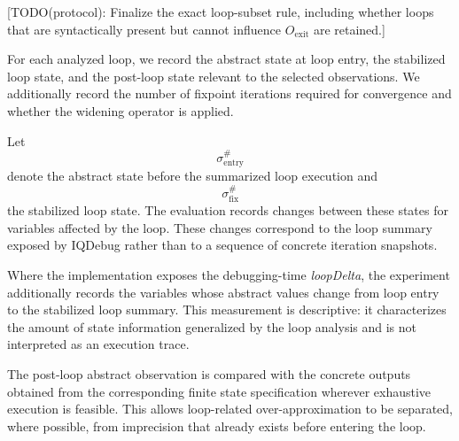 \documentclass[11pt,oneside]{report}
\theoremstyle{plain}
\theoremstyle{definition}
\theoremstyle{remark}
\begin{document}
[TODO(protocol): Finalize the exact loop-subset rule, including whether loops that are syntactically present but cannot influence \(O_{\mathrm{exit}}\) are retained.]

For each analyzed loop, we record the abstract state at loop entry, the stabilized loop state, and the post-loop state relevant to the selected observations. We additionally record the number of fixpoint iterations required for convergence and whether the widening operator is applied.

Let
\[
\sigma_{\mathrm{entry}}^\#
\]
denote the abstract state before the summarized loop execution and
\[
\sigma_{\mathrm{fix}}^\#
\]
the stabilized loop state. The evaluation records changes between these states for variables affected by the loop. These changes correspond to the loop summary exposed by IQDebug rather than to a sequence of concrete iteration snapshots.

Where the implementation exposes the debugging-time \textit{loopDelta}, the experiment additionally records the variables whose abstract values change from loop entry to the stabilized loop summary. This measurement is descriptive: it characterizes the amount of state information generalized by the loop analysis and is not interpreted as an execution trace.

The post-loop abstract observation is compared with the concrete outputs obtained from the corresponding finite state specification wherever exhaustive execution is feasible. This allows loop-related over-approximation to be separated, where possible, from imprecision that already exists before entering the loop.
\end{document}
